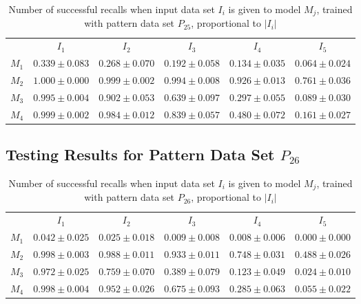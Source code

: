 \documentclass[anon]{CI}
\begin{document}
		\begin{table}[H]
			\centering
			\def\arraystretch{1.5}
			\footnotesize
			\begin{tabular}{cccccc}
				
				& $I_{1}$  & $I_{2}$  & $I_{3}$  & $I_{4}$  & $I_{5}$ \\ \cline{2-6}
				$M_{1}$  & $0.339\pm0.083$  & $0.268\pm0.070$  & $0.192\pm0.058$  & $0.134\pm0.035$  & $0.064\pm0.024$ \\
				$M_{2}$  & $1.000\pm0.000$  & $0.999\pm0.002$  & $0.994\pm0.008$  & $0.926\pm0.013$  & $0.761\pm0.036$ \\
				$M_{3}$  & $0.995\pm0.004$  & $0.902\pm0.053$  & $0.639\pm0.097$  & $0.297\pm0.055$  & $0.089\pm0.030$ \\
				$M_{4}$  & $0.999\pm0.002$  & $0.984\pm0.012$  & $0.839\pm0.057$  & $0.480\pm0.072$  & $0.161\pm0.027$ \\
				
			\end{tabular}
			\caption{Number of successful recalls when input data set $I_i$ is given to model $M_j$, trained with pattern data set $P_{25}$, proportional to $\left|I_i\right|$}
		\end{table}
		
		\subsection{Testing Results for Pattern Data Set $P_{26}$}
		
		
		\begin{table}[H]
			\centering
			\def\arraystretch{1.5}
			\footnotesize
			\begin{tabular}{cccccc}
				
				& $I_{1}$  & $I_{2}$  & $I_{3}$  & $I_{4}$  & $I_{5}$ \\ \cline{2-6}
				$M_{1}$  & $0.042\pm0.025$  & $0.025\pm0.018$  & $0.009\pm0.008$  & $0.008\pm0.006$  & $0.000\pm0.000$ \\
				$M_{2}$  & $0.998\pm0.003$  & $0.988\pm0.011$  & $0.933\pm0.011$  & $0.748\pm0.031$  & $0.488\pm0.026$ \\
				$M_{3}$  & $0.972\pm0.025$  & $0.759\pm0.070$  & $0.389\pm0.079$  & $0.123\pm0.049$  & $0.024\pm0.010$ \\
				$M_{4}$  & $0.998\pm0.004$  & $0.952\pm0.026$  & $0.675\pm0.093$  & $0.285\pm0.063$  & $0.055\pm0.022$ \\
				
			\end{tabular}
			\caption{Number of successful recalls when input data set $I_i$ is given to model $M_j$, trained with pattern data set $P_{26}$, proportional to $\left|I_i\right|$}
		\end{table}
		
\end{document}
